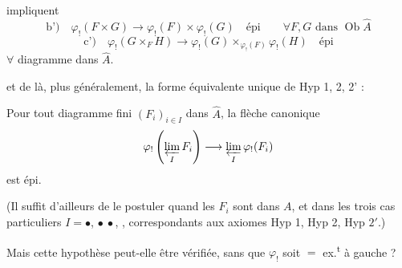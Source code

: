 
impliquent
\[
\text{b')}\quad\varphi_!(F\times G)\longrightarrow\varphi_!(F)\times\varphi_!(G)\quad\text{épi}
\qquad\forall F,G\text{ dans }\operatorname{Ob}\widehat A
\]
\[
\text{c')}\quad\varphi_!(G\times_F H)\longrightarrow
\varphi_!(G)\times_{\varphi_!(F)}\varphi_!(H)\quad\text{épi}
\]
$\forall$ diagramme
dans $\widehat A$.

et de là, plus généralement, la forme équivalente unique de Hyp 1, 2, 2' :

Pour tout diagramme fini $(F_i)_{i\in I}$ dans $\widehat A$, la flèche canonique
\[
\varphi_!\left(\varprojlim_I F_i\right)\longrightarrow\varprojlim_I\varphi_!(F_i)
\]
est épi.

(Il suffit d'ailleurs de le postuler quand les $F_i$ sont dans $A$, et dans les trois cas particuliers $I=\bullet$, $\bullet\ \bullet$,
\diagram{\begin{tikzcd}[ampersand replacement=\&,column sep=tiny,row sep=tiny]
\bullet\arrow[dr]\&\&\bullet\arrow[dl]\\
\&\bullet\&
\end{tikzcd}}, correspondants aux axiomes Hyp 1, Hyp 2, Hyp $2'$.)

Mais cette hypothèse peut-elle être vérifiée, sans que $\varphi_!$ soit $=$ ex.\textsuperscript{t} à gauche ?

